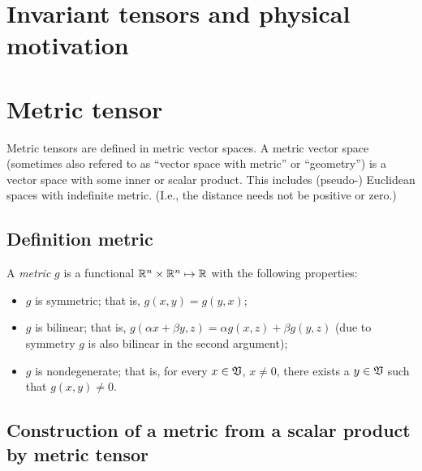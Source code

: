 \section{Invariant tensors and physical motivation}

\section{Metric tensor}

Metric tensors are defined in metric vector spaces.
A metric vector space (sometimes also refered to
as ``vector space with metric'' or ``geometry'')
is a vector space with some inner or scalar product.
This includes (pseudo-) Euclidean spaces with indefinite metric.
(I.e., the distance needs not be positive or zero.)




\subsection{Definition metric}
\label{2011-m-metrict}

A {\em metric} $g$ is a functional ${\Bbb R}^n\times{\Bbb R}^n\mapsto {\Bbb R}$
with the following properties:
\begin{itemize}
\item
$g$ is symmetric; that is, $g(x,y)=g(y,x)$;
\item
$g$ is bilinear; that is,
$g(
\alpha x + \beta y, z)
= \alpha g( x,z) + \beta g(y, z)
$ (due to symmetry $g$ is also bilinear in the second argument);
\item
$g$ is nondegenerate; that is,
for every $x\in {\frak V}$, $x\neq 0$, there exists a
$y\in {\frak V}$ such that $g(x,y)\neq 0$.
\end{itemize}



\subsection{Construction of a metric from a scalar product by metric tensor}

